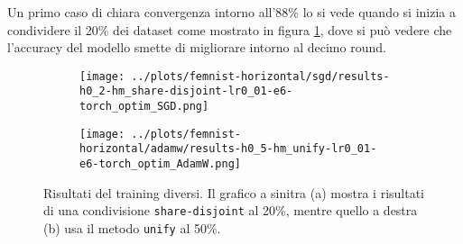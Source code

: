 Un primo caso di chiara convergenza intorno all'88\% lo si vede quando 
si inizia a condividere il 20\% dei dataset come mostrato in figura 
\ref{fig:femnists2sgd}, dove si può vedere che l'accuracy del modello 
smette di migliorare intorno al decimo round.
\begin{figure}[hb]  %
    \centering
    \begin{subfigure}[b]{0.49\textwidth}
        \centering
        \texttt{[image: ../plots/femnist-horizontal/sgd/results-h0\_2-hm\_share-disjoint-lr0\_01-e6-torch\_optim\_SGD.png]}
        \label{fig:femnists2sgd}
    \end{subfigure}
    \hfill\begin{subfigure}[b]{0.49\textwidth}
        \centering
        \texttt{[image: ../plots/femnist-horizontal/adamw/results-h0\_5-hm\_unify-lr0\_01-e6-torch\_optim\_AdamW.png]}
        \label{fig:feministu5adam}
    \end{subfigure}
    
    \caption{
        Risultati del training diversi. Il grafico a sinitra (a) 
        mostra i risultati di una condivisione \texttt{share-disjoint}
        al 20\%, mentre quello a destra (b) usa il metodo 
        \texttt{unify} al 50\%.
    }
    \label{fig:femnistadam}
\end{figure}

